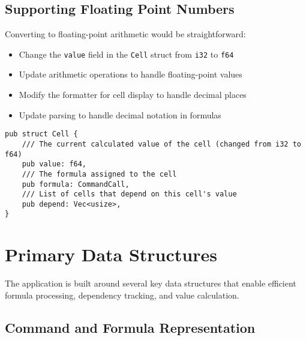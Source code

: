 \documentclass[12pt]{article}
\begin{document}
\subsection{Supporting Floating Point Numbers}
Converting to floating-point arithmetic would be straightforward:
\begin{itemize}
    \item Change the \texttt{value} field in the \texttt{Cell} struct from \texttt{i32} to \texttt{f64}
    \item Update arithmetic operations to handle floating-point values
    \item Modify the formatter for cell display to handle decimal places
    \item Update parsing to handle decimal notation in formulas
\end{itemize}

\begin{lstlisting}[caption={Cell structure with floating point support}]
pub struct Cell {
    /// The current calculated value of the cell (changed from i32 to f64)
    pub value: f64,
    /// The formula assigned to the cell
    pub formula: CommandCall,
    /// List of cells that depend on this cell's value
    pub depend: Vec<usize>,
}
\end{lstlisting}

\section{Primary Data Structures}
The application is built around several key data structures that enable efficient formula processing, dependency tracking, and value calculation.

\subsection{Command and Formula Representation}
\end{document}
